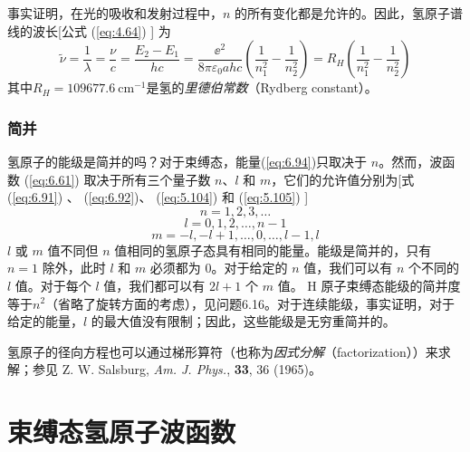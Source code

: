     事实证明，在光的吸收和发射过程中，$n$ 的所有变化都是允许的。因此，氢原子谱线的波长[公式 (\ref{eq:4.64}) ] 为
    \begin{equation}
        \tilde{\nu} = \frac{1}{\lambda} = \frac{\nu}{c} = \frac{E_2 - E_1}{hc} = \frac{\ee ^2}{8\pi\varepsilon_0ahc}\left(\frac{1}{n_1^2} - \frac{1}{n_2^2}\right) = R_H\left(\frac{1}{n_1^2} - \frac{1}{n_2^2}\right)
        \label{eq:6.95}
    \end{equation}
    其中$R_H = 109677.6 \: \mathrm{cm}^{-1}$是氢的\textit{里德伯常数}（Rydberg constant）。

\subsubsection*{简并}

    氢原子的能级是简并的吗？对于束缚态，能量(\ref{eq:6.94})只取决于 $n$。然而，波函数 (\ref{eq:6.61}) 取决于所有三个量子数 $n$、$l$ 和 $m$，它们的允许值分别为[式 (\ref{eq:6.91}) 、 (\ref{eq:6.92})、 (\ref{eq:5.104})  和 (\ref{eq:5.105}) ]
    \begin{equation}
        \boxed{
            n = 1,2,3,\ldots
        }
        \label{eq:6.96}
    \end{equation}
    \begin{equation}
        \boxed{
            l = 0,1,2,\ldots,n-1
        }
        \label{eq:6.97}
    \end{equation}
    \begin{equation}
        \boxed{
            m = -l,-l+1,\ldots,0,\ldots,l-1,l
        }
        \label{eq:6.98}
    \end{equation}
    $l$ 或 $m$ 值不同但 $n$ 值相同的氢原子态具有相同的能量。能级是简并的，只有 $n=1$ 除外，此时 $l$ 和 $m$ 必须都为 0。对于给定的 $n$ 值，我们可以有 $n$ 个不同的 $l$ 值。对于每个 $l$ 值，我们都可以有 $2l+1$ 个 $m$ 值。 H 原子束缚态能级的简并度等于$n^2$（省略了旋转方面的考虑），见问题6.16。对于连续能级，事实证明，对于给定的能量，$l$ 的最大值没有限制；因此，这些能级是无穷重简并的。

    氢原子的径向方程也可以通过梯形算符（也称为\textit{因式分解}（factorization））来求解；参见 Z. W. Salsburg, \textit{Am. J. Phys.}, \textbf{33}, 36 (1965)。

\section{束缚态氢原子波函数}
\label{sec:6.6 The Bound-State Hydrogen-Atom Wave Functions}

